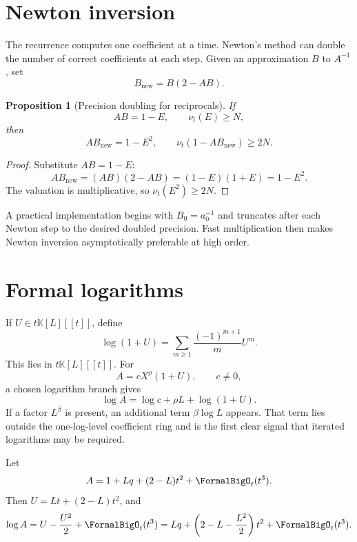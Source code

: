 \documentclass[11pt,openany]{book}
\theoremstyle{definition}
\theoremstyle{plain}
\newtheorem{proposition}{Proposition}[chapter]
\theoremstyle{remark}
\newcommand{\K}{\mathbb{K}}
\newcommand{\val}{\nu}
\begin{document}
\section{Newton inversion}
The recurrence computes one coefficient at a time.  Newton's method can double
the number of correct coefficients at each step.  Given an approximation \(B\)
to \(A^{-1}\), set
\begin{equation}\label{eq:newton-recip}
 B_{\mathrm{new}}=B(2-AB).
\end{equation}

\begin{proposition}[Precision doubling for reciprocals]\label{prop:newton-recip}
If
\[
 AB=1-E,
 \qquad \val_t(E)\ge N,
\]
then
\[
 AB_{\mathrm{new}}=1-E^2,
 \qquad \val_t(1-AB_{\mathrm{new}})\ge2N.
\]
\end{proposition}
\begin{proof}
Substitute \(AB=1-E\):
\[
 AB_{\mathrm{new}}
 =(AB)(2-AB)=(1-E)(1+E)=1-E^2.
\]
The valuation is multiplicative, so \(\val_t(E^2)\ge2N\).
\end{proof}

A practical implementation begins with \(B_0=a_0^{-1}\) and truncates after
each Newton step to the desired doubled precision.  Fast multiplication then
makes Newton inversion asymptotically preferable at high order.

\section{Formal logarithms}
If \(U\in t\K[L][[t]]\), define
\begin{equation}\label{eq:formal-log1p}
 \log(1+U)=\sum_{m\ge1}\frac{(-1)^{m+1}}mU^m.
\end{equation}
This lies in \(t\K[L][[t]]\).  For
\[
 A=cX^\rho(1+U),
 \qquad c\ne0,
\]
a chosen logarithm branch gives
\begin{equation}\label{eq:formal-log-general}
 \log A=\log c+\rho L+\log(1+U).
\end{equation}
If a factor \(L^\beta\) is present, an additional term \(\beta\log L\) appears.
That term lies outside the one-log-level coefficient ring and is the first clear
signal that iterated logarithms may be required.

\begin{workedbox}
Let
\[
 A=1+Lq+(2-L)t^2+\FormalBigO_t(t^3).
\]
Then \(U=Lt+(2-L)t^2\), and
\[
 \log A=U-\frac{U^2}{2}+\FormalBigO_t(t^3)
 =Lq+\left(2-L-\frac{L^2}{2}\right)t^2+\FormalBigO_t(t^3).
\]
\end{workedbox}
\end{document}
